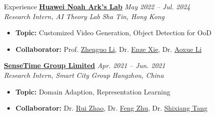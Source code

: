 \documentclass[a4paper]{resume} %
\begin{document}
\begin{rSection}{Experience}
{\bf \href{http://dev3.noahlab.com.hk}{Huawei Noah Ark's Lab}} \hfill{\it May 2022 -- Jul. 2024}\\
{\it Research Intern, AI Theory Lab} \hfill{\it Sha Tin, Hong Kong}
\begin{itemize}
    \item {\bf Topic:} Customized Video Generation, Object Detection for OoD
 	\item {\bf Collaborator:} Prof. \href{https://zhenguol.github.io}{Zhenguo Li}, Dr. \href{https://xieenze.github.io}{Enze Xie}, Dr. \href{https://openreview.net/profile?id=~Aoxue\_Li2}{Aoxue Li}
\end{itemize}


 {\bf \href{https://www.sensetime.com/en}{SenseTime Group Limited}} \hfill{\it Apr. 2021 -- Jun. 2021}\\
 {\it Research Intern, Smart City Group} \hfill{\it Hangzhou, China}
 \begin{itemize}
     \item {\bf Topic:} Domain Adaption, Representation Learning
  	\item {\bf Collaborator:} Dr. \href{http://zhaorui.xyz/}{Rui Zhao}, Dr. \href{https://zhufengx.github.io/}{Feng Zhu}, Dr. \href{https://scholar.google.com.tw/citations?user=TJ4ihdkAAAAJ}{Shixiang Tang}
 \end{itemize}



\end{rSection}
\end{document}
